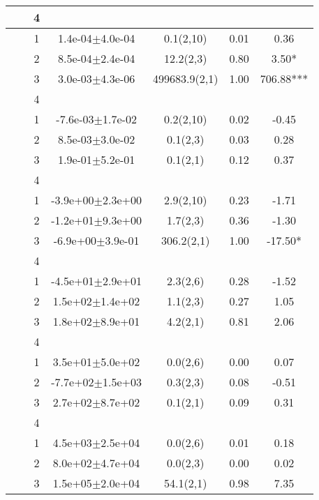 \begin{longtable}{llccccS[table-format=-2.2, table-space-text-post = {***}]}
   &  & 4 &  &  &  &  \\ 
   \midrule
{} & {} & 1 &  1.4e-04$\pm$4.0e-04 & 0.1(2,10) & 0.01 & 0.36 \\ 
   &  & 2 &  8.5e-04$\pm$2.4e-04 & 12.2(2,3) & 0.80 & 3.50* \\ 
   &  & 3 &  3.0e-03$\pm$4.3e-06 & 499683.9(2,1) & 1.00 & 706.88*** \\ 
   &  & 4 &  &  &  &  \\ 
   \midrule
{} & {} & 1 & -7.6e-03$\pm$1.7e-02 & 0.2(2,10) & 0.02 & -0.45 \\ 
   &  & 2 &  8.5e-03$\pm$3.0e-02 & 0.1(2,3) & 0.03 & 0.28 \\ 
   &  & 3 &  1.9e-01$\pm$5.2e-01 & 0.1(2,1) & 0.12 & 0.37 \\ 
   &  & 4 &  &  &  &  \\ 
   \midrule
{} & {} & 1 & -3.9e+00$\pm$2.3e+00 & 2.9(2,10) & 0.23 & -1.71 \\ 
   &  & 2 & -1.2e+01$\pm$9.3e+00 & 1.7(2,3) & 0.36 & -1.30 \\ 
   &  & 3 & -6.9e+00$\pm$3.9e-01 & 306.2(2,1) & 1.00 & -17.50* \\ 
   &  & 4 &  &  &  &  \\ 
   \midrule
{} & {} & 1 & -4.5e+01$\pm$2.9e+01 & 2.3(2,6) & 0.28 & -1.52 \\ 
   &  & 2 &  1.5e+02$\pm$1.4e+02 & 1.1(2,3) & 0.27 & 1.05 \\ 
   &  & 3 &  1.8e+02$\pm$8.9e+01 & 4.2(2,1) & 0.81 & 2.06 \\ 
   &  & 4 &  &  &  &  \\ 
   \midrule
{} & {} & 1 &  3.5e+01$\pm$5.0e+02 & 0.0(2,6) & 0.00 & 0.07 \\ 
   &  & 2 & -7.7e+02$\pm$1.5e+03 & 0.3(2,3) & 0.08 & -0.51 \\ 
   &  & 3 &  2.7e+02$\pm$8.7e+02 & 0.1(2,1) & 0.09 & 0.31 \\ 
   &  & 4 &  &  &  &  \\ 
   \midrule
{} & {} & 1 &  4.5e+03$\pm$2.5e+04 & 0.0(2,6) & 0.01 & 0.18 \\ 
   &  & 2 &  8.0e+02$\pm$4.7e+04 & 0.0(2,3) & 0.00 & 0.02 \\ 
   &  & 3 &  1.5e+05$\pm$2.0e+04 & 54.1(2,1) & 0.98 & 7.35 \\ 

\end{longtable}
